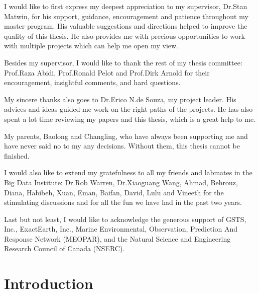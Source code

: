 \documentclass[12pt,glossary]{dalcsthesis}
\begin{document}
\begin{acknowledgements}

I would like to first express my deepest appreciation to my supervisor, Dr.Stan Matwin, for his support, guidance, encouragement and patience throughout my master program. His valuable suggestions and directions helped to improve the quality of this thesis. He also provides me with precious opportunities to work with multiple projects which can help me open my view.

Besides my supervisor, I would like to thank the rest of my thesis committee: Prof.Raza Abidi, Prof.Ronald Pelot and Prof.Dirk Arnold for their encouragement, insightful comments, and hard questions.

My sincere thanks also goes to Dr.Erico N.de Souza, my project leader. His advices and ideas guided me work on the right paths of the projects. He has also spent a lot time reviewing my papers and this thesis, which is a great help to me.

My parents, Baolong and Changling, who have always been supporting me and have never said no to my any decisions. Without them, this thesis cannot be finished.


I would also like to extend my gratefulness to all my friends and labmates in the Big Data Institute: Dr.Rob Warren, Dr.Xiaoguang Wang, Ahmad, Behrouz, Diana, Habibeh, Xuan, Eman, Baifan, David, Lulu and Vineeth for the stimulating discussions and for all the fun we have had in the past two years.

Last but not least, I would like to  acknowledge the generous support of GSTS, Inc., ExactEarth, Inc., Marine Environmental, Observation, Prediction And Response Network (MEOPAR), and the Natural Science and Engineering Research Council of Canada (NSERC).




\end{acknowledgements}

\mainmatter




\chapter{Introduction}
\end{document}
